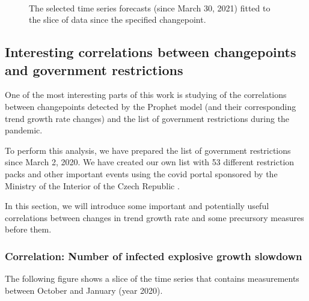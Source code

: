 \begin{figure}[!ht]
 \\
\caption{The selected time series forecasts (since March 30, 2021) fitted to the slice of data since the specified changepoint.}
\label{fig:forecast_last_b}
\end{figure}
\clearpage

\hypertarget{ss3.3.4}{\subsection{Interesting correlations between changepoints and government restrictions}}

One of the most interesting parts of this work is studying of the correlations between changepoints detected by the Prophet model (and their corresponding trend growth rate changes) and the list of government restrictions during the pandemic.

To perform this analysis, we have prepared the list of government restrictions since March 2, 2020. We have created our own list with 53 different restriction packs and other important events using the covid portal sponsored by the Ministry of the Interior of the Czech Republic \cite{covidportal}.

In this section, we will introduce some important and potentially useful correlations between changes in trend growth rate and some precursory measures before them.

\subsubsection{Correlation: Number of infected explosive growth slowdown}

The following figure shows a slice of the time series that contains measurements between October and January (year 2020). 

